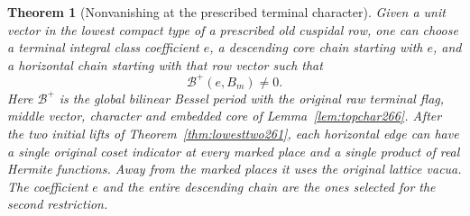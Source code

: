\documentclass[a4paper,11pt]{article}
\newtheorem{theorem}[proposition]{Theorem}
\theoremstyle{definition}
\theoremstyle{remark}
\numberwithin{equation}{section}
\begin{document}
\begin{theorem}[Nonvanishing at the prescribed terminal character]\leavevmode
\label{thm:fullperiod266}
Given a unit vector in the lowest compact type of a prescribed
old cuspidal row, one can choose a terminal integral class
coefficient \(e\), a descending core chain starting with \(e\),
and a horizontal chain starting with that row vector such that
\[
                    \mathcal B^+(e,B_m)\ne0 .
\]
Here \(\mathcal B^+\) is the global bilinear Bessel period
with the original raw terminal flag, middle vector, character
and embedded core of Lemma~\ref{lem:topchar266}. After the
two initial lifts of Theorem~\ref{thm:lowesttwo261}, each
horizontal edge can have a single original coset indicator
at every marked place and a single product of real Hermite
functions. Away from the marked places it uses the original
lattice vacua. The coefficient \(e\) and the entire descending
chain are the ones selected for the second restriction.
\end{theorem}
\end{document}
